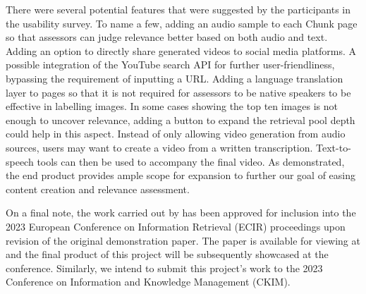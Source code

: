 \documentclass{l4proj}
\begin{document}
There were several potential features that were suggested by the participants in the usability survey. To name a few, adding an audio sample to each Chunk page so that assessors can judge relevance better based on both audio and text. Adding an option to directly share generated videos to social media platforms. A possible integration of the YouTube search API for further user-friendliness, bypassing the requirement of inputting a URL. Adding a language translation layer to pages so that it is not required for assessors to be native speakers to be effective in labelling images. In some cases showing the top ten images is not enough to uncover relevance, adding a button to expand the retrieval pool depth could help in this aspect. Instead of only allowing video generation from audio sources, users may want to create a video from a written transcription. Text-to-speech tools can then be used to accompany the final video. As demonstrated, the end product provides ample scope for expansion to further our goal of easing content creation and relevance assessment.

On a final note, the work carried out by \cite{parker} has been approved for inclusion into the 2023 European Conference on Information Retrieval (ECIR) proceedings upon revision of the original demonstration paper. The paper is available for viewing at \cite{videography} and the final product of this project will be subsequently showcased at the conference. Similarly, we intend to submit this project's work to the 2023 Conference on Information and Knowledge Management (CKIM).


\end{document}
